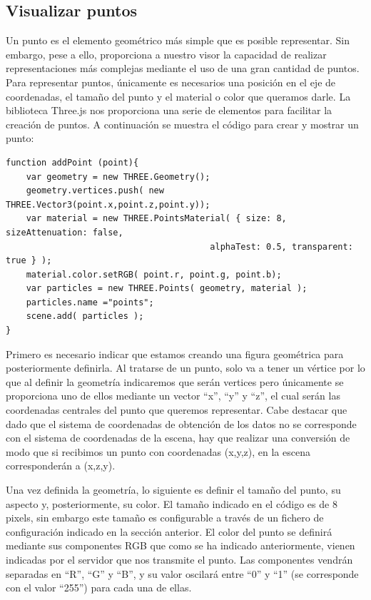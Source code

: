 \subsection{Visualizar puntos}
Un punto es el elemento geométrico más simple que es posible representar. Sin embargo, pese a ello, proporciona a nuestro visor la capacidad de realizar representaciones más complejas mediante el uso de una gran cantidad de puntos. Para representar puntos, únicamente es necesarios una posición en el eje de coordenadas, el tamaño del punto y el material o color que queramos darle. 
La biblioteca Three.js nos proporciona una serie de elementos para facilitar la creación de puntos. A continuación se muestra el código para crear y mostrar un punto:
\begin{lstlisting}[frame=single]
function addPoint (point){
	var geometry = new THREE.Geometry();
	geometry.vertices.push( new THREE.Vector3(point.x,point.z,point.y));
	var material = new THREE.PointsMaterial( { size: 8, sizeAttenuation: false, 
										alphaTest: 0.5, transparent: true } );
	material.color.setRGB( point.r, point.g, point.b);
	var particles = new THREE.Points( geometry, material );
	particles.name ="points";
	scene.add( particles );
}
\end{lstlisting}
Primero es necesario indicar que estamos creando una figura geométrica para posteriormente definirla. Al tratarse de un punto, solo va a tener un vértice por lo que al definir la geometría indicaremos que serán vertices pero únicamente se proporciona uno de ellos mediante un vector ``x'', ``y'' y  ``z'', el cual serán las coordenadas centrales del punto que queremos representar. Cabe destacar que dado que el sistema de coordenadas de obtención de los datos no se corresponde con el sistema de coordenadas de la escena, hay que realizar una conversión de modo que si recibimos un punto con coordenadas (x,y,z), en la escena corresponderán a (x,z,y). 


Una vez definida la geometría, lo siguiente es definir el tamaño del punto, su aspecto y, posteriormente, su color. El tamaño indicado en el código es de 8 pixels, sin embargo este tamaño es configurable a través de un fichero de configuración indicado en la sección anterior. El color del punto se definirá mediante sus componentes RGB que como se ha indicado anteriormente, vienen indicadas por el servidor que nos transmite el punto. Las componentes vendrán separadas en ``R'', ``G'' y ``B'', y su valor oscilará entre ``0'' y ``1'' (se corresponde con el valor ``255'') para cada una de ellas.


